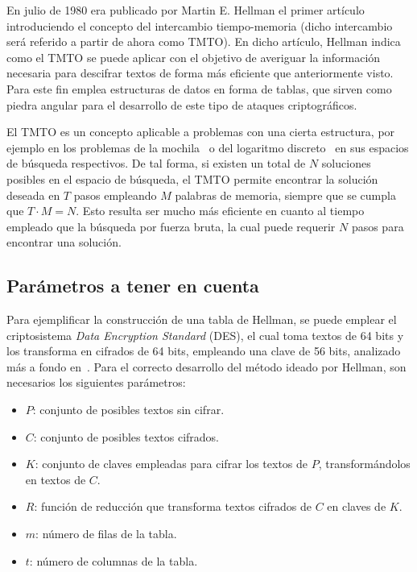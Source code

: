\documentclass[12pt,spanish,listoffigures,listoftables,listofalgorithms]{tfgetsinf}
\begin{document}
En julio de 1980 era publicado por Martin E. Hellman el primer artículo introduciendo el concepto del intercambio tiempo-memoria \cite{hellman}(dicho intercambio será referido a partir de ahora como TMTO). En dicho artículo, Hellman indica como el TMTO se puede aplicar con el objetivo de averiguar la información necesaria para descifrar textos de forma más eficiente que anteriormente visto. Para este fin emplea estructuras de datos en forma de tablas, que sirven como piedra angular para el desarrollo de este tipo de ataques criptográficos.

El TMTO es un concepto aplicable a problemas con una cierta estructura, por ejemplo en los problemas de la mochila~\cite{knapsack} o del logaritmo discreto~\cite{logarithm} en sus espacios de búsqueda respectivos. De tal forma, si existen un total de $N$ soluciones posibles en el espacio de búsqueda, el TMTO permite encontrar la solución deseada en $T$ pasos empleando $M$ palabras de memoria, siempre que se cumpla que $T \cdot M = N$. Esto resulta ser mucho más eficiente en cuanto al tiempo empleado que la búsqueda por fuerza bruta, la cual puede requerir $N$ pasos para encontrar una solución.

\subsection{Parámetros a tener en cuenta}\label{params}

Para ejemplificar la construcción de una tabla de Hellman, se puede emplear el criptosistema \textit{Data Encryption Standard} (DES), el cual toma textos de 64 bits y los transforma en cifrados de 64 bits, empleando una clave de 56 bits, analizado más a fondo en~\cite{DES}. Para el correcto desarrollo del método ideado por Hellman, son necesarios  los siguientes parámetros:

\begin{itemize}

    \item $P$: conjunto de posibles textos sin cifrar.
    
    \item $C$: conjunto de posibles textos cifrados.
    
    \item $K$: conjunto de claves empleadas para cifrar los textos de $P$, transformándolos en textos de $C$.
    
    \item $R$: función de reducción que transforma textos cifrados de $C$ en claves de $K$.
    
    \item $m$: número de filas de la tabla.
    
    \item $t$: número de columnas de la tabla.

\end{itemize}
\end{document}

